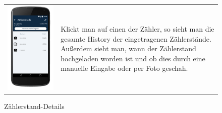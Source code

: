 \begin{figure}[h]
\begin{tabularx}{\textwidth}{X  X}
	\includegraphics[scale = 0.155]{img/AndroidMockup/history} \caption{Zählerstand-Details} & Klickt man auf einen der Zähler, so sieht man die gesamte History der eingetragenen Zählerstände. Außerdem sieht man, wann der Zählerstand hochgeladen worden ist und ob dies durch eine manuelle Eingabe oder per Foto geschah. \\
\end{tabularx}
\end{figure}

